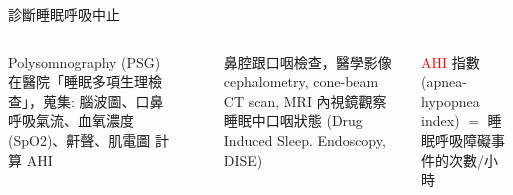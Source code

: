 \documentclass[aspectratio=169]{beamer}
\begin{document}
\begin{frame}{診斷睡眠呼吸中止}
\begin{columns}
        \begin{outline}
        \1 Polysomnography (PSG) 在醫院「睡眠多項生理檢查」，蒐集:
        \2 腦波圖、口鼻呼吸氣流、血氧濃度(SpO2)、鼾聲、肌電圖
        \2 計算 AHI

        \end{outline}
~\\    
~\\
~\\
~\\
~\\
~\\
        \begin{outline}
        \1 鼻腔跟口咽檢查，醫學影像
        \2 cephalometry, cone-beam CT scan, MRI
        \1 內視鏡觀察睡眠中口咽狀態 (Drug Induced Sleep. Endoscopy, DISE) 
    \end{outline}
    
    \textcolor{red}{AHI} 指數(apnea-hypopnea index) $=$ 睡眠呼吸障礙事件的次數/小時
    ~\\
    ~\\
        \centering


\end{columns}
\end{frame}
\end{document}

